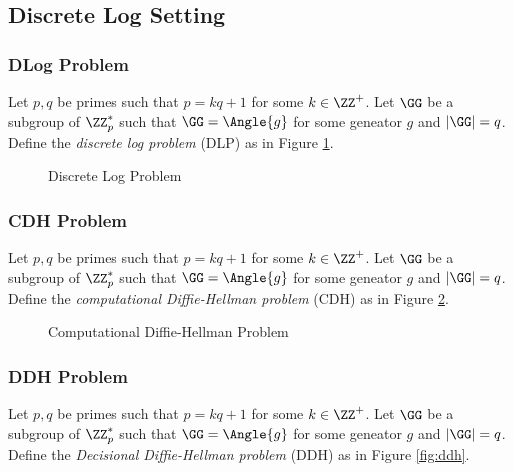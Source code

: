 \documentclass[11pt,a4paper]{article}
\begin{document}
\subsection{Discrete Log Setting}
\subsubsection{DLog Problem}
Let $p,q$ be primes such that $p = kq + 1$ for some $k \in \ZZ^+$. Let $\GG$ be a subgroup of $\ZZ_p^*$ such that $\GG = \Angle{g}$ for some geneator $g$ and $|\GG| = q$. Define the \textit{discrete log problem} (DLP) as in Figure \ref{fig:dlog}.

\begin{figure}[H]
\begin{pchstack}[ center , boxed, space=0.5cm]
\end{pchstack}
\caption{Discrete Log Problem}
\label{fig:dlog}
\end{figure}


\subsubsection{CDH Problem}
Let $p,q$ be primes such that $p = kq + 1$ for some $k \in \ZZ^+$. Let $\GG$ be a subgroup of $\ZZ_p^*$ such that $\GG = \Angle{g}$ for some geneator $g$ and $|\GG| = q$. Define the \textit{computational Diffie-Hellman problem} (CDH) as in Figure \ref{fig:cdh}.

\begin{figure}[H]
\begin{pchstack}[ center , boxed, space=0.5cm]
\end{pchstack}
\caption{Computational Diffie-Hellman Problem}
\label{fig:cdh}
\end{figure}


\subsubsection{DDH Problem}
Let $p,q$ be primes such that $p = kq + 1$ for some $k \in \ZZ^+$. Let $\GG$ be a subgroup of $\ZZ_p^*$ such that $\GG = \Angle{g}$ for some geneator $g$ and $|\GG| = q$. Define the \textit{Decisional Diffie-Hellman problem} (DDH) as in Figure \ref{fig:ddh}.
\end{document}
